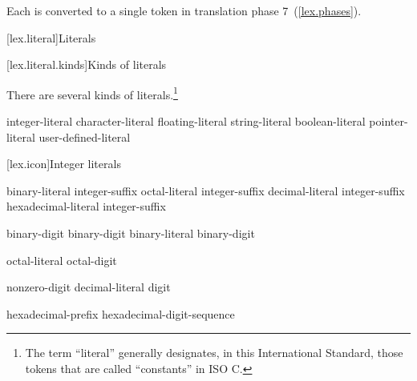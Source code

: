 Each  is converted to a single token
in translation phase 7~(\ref{lex.phases}).%
%

[lex.literal]{Literals}%

[lex.literal.kinds]{Kinds of literals}

\pnum
{}%
%
There are several kinds of literals.\footnote{The term ``literal'' generally designates, in this
International Standard, those tokens that are called ``constants'' in
ISO C. }

\begin{bnf}
\br
    integer-literal\br
    character-literal\br
    floating-literal\br
    string-literal\br
    boolean-literal\br
    pointer-literal\br
    user-defined-literal
\end{bnf}

[lex.icon]{Integer literals}

%
\begin{bnf}
\br
    binary-literal integer-suffix\opt\br
    octal-literal integer-suffix\opt\br
    decimal-literal integer-suffix\opt\br
    hexadecimal-literal integer-suffix\opt
\end{bnf}

\begin{bnf}
\br
     binary-digit\br
     binary-digit\br
    binary-literal \opt binary-digit
\end{bnf}

\begin{bnf}
\br
    \br
    octal-literal \opt octal-digit
\end{bnf}

\begin{bnf}
\br
    nonzero-digit\br
    decimal-literal \opt digit
\end{bnf}

\begin{bnf}
\br
    hexadecimal-prefix hexadecimal-digit-sequence
\end{bnf}

\begin{bnf}
\br
    \br
\end{bnf}

